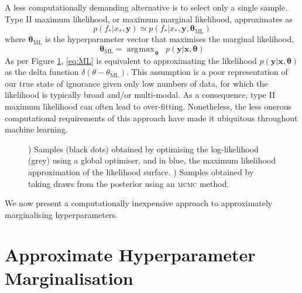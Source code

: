 \documentclass{article}
\newcommand{\vect}[1]{\mathbf{#1}}
\newcommand{\xd}{\vect{x}}
\newcommand{\yd}{\vect{y}}
\DeclareMathOperator*{\argmax}{\arg\!\max\!}
\begin{document}
A less computationally demanding alternative is to select only a single sample. Type II maximum likelihood, or maximum marginal likelihood, approximates as
\begin{equation} \label{eq:ML}
p(f_* |x_*, \yd) \simeq p(f_* | x_*, \yd,\bm{\theta}_{\mathrm{ML}})
\end{equation}
where $\bm{\theta}_{\mathrm{ML}}$ is the hyperparameter vector that maximises the marginal likelihood, 
\begin{equation}
\bm{\theta}_{\mathrm{ML}} = \argmax_{\bm{\theta}} \;\; p(\yd|\xd,\bm{\theta})
\end{equation}
As per Figure \ref{fig:ML}, \eqref{eq:ML} is equivalent to approximating the likelihood $p(\yd|\xd,\bm{\theta})$ as the delta function $\delta(\theta - \theta_{\mathrm{ML}})$. This assumption is a poor representation of our true state of ignorance given only low numbers of data, for which the likelihood is typically broad and/or multi-modal. As a consequence, type II maximum likelihood can often lead to over-fitting. Nonetheless, the less onerous computational requirements of this approach have made it ubiquitous throughout machine learning. 

\begin{figure}
	\begin{subfigure}[b]{7cm}
	  \caption{}
	  \label{fig:ML}
	\end{subfigure}
	\begin{subfigure}[b]{7cm}
	  \caption{}
	  \label{fig:MCMC}
	\end{subfigure}
\caption{) Samples (black dots) obtained by optimising the log-likelihood (grey) using a global optimiser, and in blue, the maximum likelihood approximation of the likelihood surface. ) Samples obtained by taking draws from the posterior using an {\scshape mcmc} method.}
\end{figure}

We now present a computationally inexpensive approach to approximately marginalising hyperparameters.

\section{Approximate Hyperparameter Marginalisation}
\end{document}
